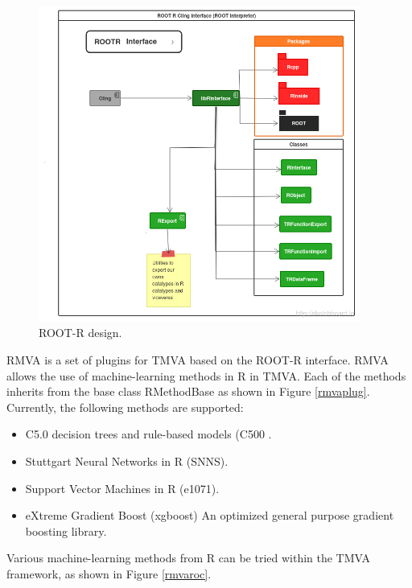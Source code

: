 \documentclass[a4paper]{jpconf}
\begin{document}
\begin{figure}[h]
\centering
\includegraphics[width=25pc]{img/rootr.png}\caption{\label{rootr:label} ROOT-R design.}
\end{figure}
RMVA is a set of plugins for TMVA based on the ROOT-R interface. RMVA allows the use of machine-learning methods in R in TMVA.  Each of the methods inherits from the base class RMethodBase as shown in Figure \ref{rmvaplug}. Currently, the following methods are supported: 

\begin{itemize}  
\item C5.0 decision trees and rule-based models (C500 \cite{c50}.
\item Stuttgart Neural Networks in R (SNNS)\cite{rsnns}.
\item Support Vector Machines in R (e1071)\cite{e1071}.
\item eXtreme Gradient Boost (xgboost) An optimized
general purpose gradient boosting library\cite{chen2015xgboost}.
\end{itemize}
Various machine-learning methods from R can be tried within the TMVA framework, as shown in Figure \ref{rmvaroc}.
\end{document}
